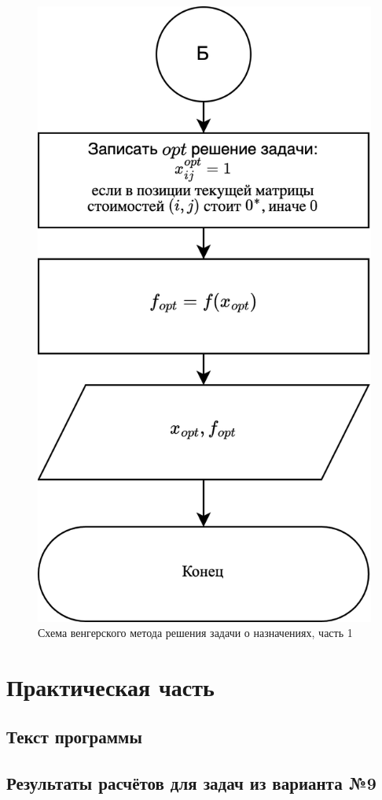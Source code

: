 \documentclass{bmstu}
\begin{document}
\begin{figure}[h!]
	\begin{center}
		\includegraphics[scale=0.2]{inc/img/3.png}
	\end{center}
	\caption{Схема венгерского метода решения задачи о назначениях, часть 1}
	\label{img:3}
\end{figure}

\chapter{Практическая часть}

\section{Текст программы}


\section{Результаты расчётов для задач из варианта №9}


	
\end{document}
